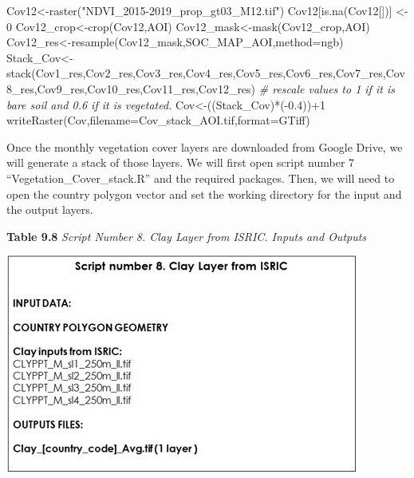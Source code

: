 \documentclass[
  10pt,
  b5paper,
]{book}
\newenvironment{Shaded}{\begin{snugshade}}{\end{snugshade}}
\newcommand{\AttributeTok}[1]{\textcolor[rgb]{0.77,0.63,0.00}{#1}}
\newcommand{\CommentTok}[1]{\textcolor[rgb]{0.56,0.35,0.01}{\textit{#1}}}
\newcommand{\DecValTok}[1]{\textcolor[rgb]{0.00,0.00,0.81}{#1}}
\newcommand{\FloatTok}[1]{\textcolor[rgb]{0.00,0.00,0.81}{#1}}
\newcommand{\FunctionTok}[1]{\textcolor[rgb]{0.00,0.00,0.00}{#1}}
\newcommand{\NormalTok}[1]{#1}
\newcommand{\OtherTok}[1]{\textcolor[rgb]{0.56,0.35,0.01}{#1}}
\newcommand{\SpecialCharTok}[1]{\textcolor[rgb]{0.00,0.00,0.00}{#1}}
\newcommand{\StringTok}[1]{\textcolor[rgb]{0.31,0.60,0.02}{#1}}
\begin{document}
\begin{Shaded}
\begin{Highlighting}[]
\NormalTok{Cov12}\OtherTok{\textless{}{-}}\FunctionTok{raster}\NormalTok{(}\StringTok{"NDVI\_2015{-}2019\_prop\_gt03\_M12.tif"}\NormalTok{)}
\NormalTok{Cov12[}\FunctionTok{is.na}\NormalTok{(Cov12[])] }\OtherTok{\textless{}{-}} \DecValTok{0}
\NormalTok{Cov12\_crop}\OtherTok{\textless{}{-}}\FunctionTok{crop}\NormalTok{(Cov12,AOI)}
\NormalTok{Cov12\_mask}\OtherTok{\textless{}{-}}\FunctionTok{mask}\NormalTok{(Cov12\_crop,AOI)}
\NormalTok{Cov12\_res}\OtherTok{\textless{}{-}}\FunctionTok{resample}\NormalTok{(Cov12\_mask,SOC\_MAP\_AOI,}\AttributeTok{method=}\StringTok{\textquotesingle{}ngb\textquotesingle{}}\NormalTok{) }
\NormalTok{Stack\_Cov}\OtherTok{\textless{}{-}}\FunctionTok{stack}\NormalTok{(Cov1\_res,Cov2\_res,Cov3\_res,Cov4\_res,Cov5\_res,Cov6\_res,Cov7\_res,Cov8\_res,Cov9\_res,Cov10\_res,Cov11\_res,Cov12\_res)}
\CommentTok{\# rescale values to 1 if it is bare soil and 0.6 if it is vegetated.}
\NormalTok{Cov}\OtherTok{\textless{}{-}}\NormalTok{((Stack\_Cov)}\SpecialCharTok{*}\NormalTok{(}\SpecialCharTok{{-}}\FloatTok{0.4}\NormalTok{))}\SpecialCharTok{+}\DecValTok{1}
\FunctionTok{writeRaster}\NormalTok{(Cov,}\AttributeTok{filename=}\StringTok{\textquotesingle{}Cov\_stack\_AOI.tif\textquotesingle{}}\NormalTok{,}\AttributeTok{format=}\StringTok{\textquotesingle{}GTiff\textquotesingle{}}\NormalTok{)}
\end{Highlighting}
\end{Shaded}

Once the monthly vegetation cover layers are downloaded from Google Drive, we will generate a stack of those layers. We will first open script number 7 ``Vegetation\_Cover\_stack.R'' and the required packages. Then, we will need to open the country polygon vector and set the working directory for the input and the output layers.

\textbf{Table 9.8} \emph{Script Number 8. Clay Layer from ISRIC. Inputs and Outputs}

\includegraphics{tables/Table_9.7.png}
\end{document}
